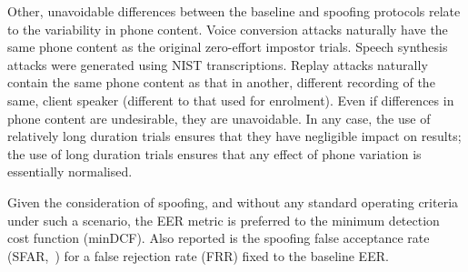 Other, unavoidable differences between the baseline and spoofing protocols relate to the variability in phone content.  Voice conversion attacks naturally have the same phone content as the original zero-effort impostor trials.  Speech synthesis attacks were generated using NIST transcriptions.  Replay attacks naturally contain the same phone content as that in another, different recording of the same, client speaker (different to that used for enrolment).  Even if differences in phone content are undesirable, they are unavoidable.  In any case, the use of relatively long duration trials ensures that they have negligible impact on results; the use of long duration trials ensures that any effect of phone variation is essentially normalised.  


Given the consideration of spoofing, and without any standard operating criteria under such a scenario, the EER metric is preferred to the minimum detection cost function (minDCF).  Also reported is the spoofing false acceptance rate (SFAR,~\cite{Johnson2010}) for a false rejection rate (FRR) fixed to the baseline EER.
